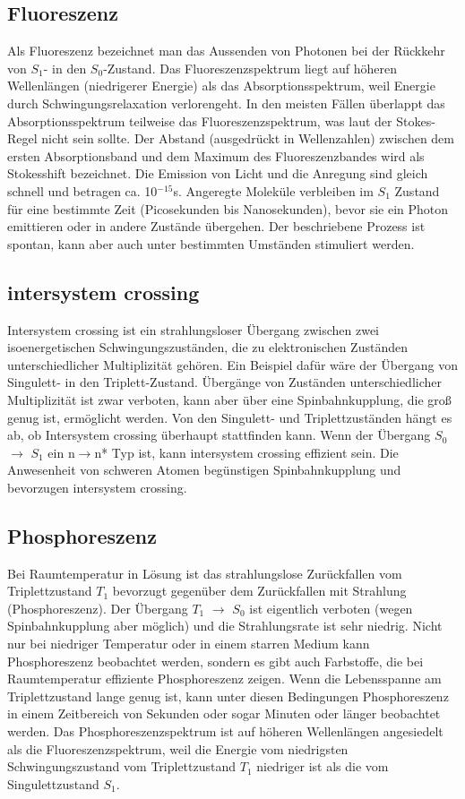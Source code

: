 \subsection{Fluoreszenz}
Als Fluoreszenz bezeichnet man das Aussenden von Photonen bei der Rückkehr von $S_1$- in den $S_0$-Zustand. Das Fluoreszenzspektrum liegt auf höheren Wellenlängen (niedrigerer Energie) als das Absorptionsspektrum, weil Energie durch Schwingungsrelaxation verlorengeht. In den meisten Fällen überlappt das Absorptionsspektrum teilweise das Fluoreszenzspektrum, was laut der Stokes-Regel nicht sein sollte. Der Abstand (ausgedrückt in Wellenzahlen) zwischen dem ersten Absorptionsband und dem Maximum des Fluoreszenzbandes wird als Stokesshift bezeichnet. Die Emission von Licht und die Anregung sind gleich schnell und betragen ca. 10$^{-15}$s. Angeregte Moleküle verbleiben im $S_1$ Zustand für eine bestimmte Zeit (Picosekunden bis Nanosekunden), bevor sie ein Photon emittieren oder in andere Zustände übergehen. Der beschriebene Prozess ist spontan, kann aber auch unter bestimmten Umständen stimuliert werden.
\subsection{intersystem crossing}
Intersystem crossing ist ein strahlungsloser Übergang zwischen zwei isoenergetischen  Schwingungszuständen, die zu elektronischen Zuständen unterschiedlicher Multiplizität gehören. Ein Beispiel dafür wäre der Übergang von Singulett- in den Triplett-Zustand. Übergänge von Zuständen unterschiedlicher Multiplizität ist zwar verboten, kann aber  über eine Spinbahnkupplung, die groß genug ist, ermöglicht werden. Von den Singulett- und Triplettzuständen hängt es ab, ob Intersystem crossing überhaupt stattfinden kann. Wenn der Übergang $S_0$ $\rightarrow$  $S_1$ ein n$\rightarrow$n* Typ ist, kann intersystem crossing effizient sein. Die Anwesenheit von schweren Atomen begünstigen Spinbahnkupplung und bevorzugen intersystem crossing.

\subsection{Phosphoreszenz}
Bei Raumtemperatur in Lösung ist das strahlungslose Zurückfallen vom Triplettzustand $T_1$ bevorzugt gegenüber dem Zurückfallen mit Strahlung (Phosphoreszenz). Der Übergang $T_1$ $\rightarrow$ $S_0$ ist eigentlich verboten (wegen Spinbahnkupplung aber möglich) und die Strahlungsrate ist sehr niedrig. Nicht nur bei niedriger Temperatur oder in einem starren Medium kann Phosphoreszenz beobachtet werden, sondern es gibt auch Farbstoffe, die bei Raumtemperatur effiziente Phosphoreszenz zeigen. %
Wenn die Lebensspanne am Triplettzustand lange genug ist, kann unter diesen Bedingungen Phosphoreszenz in einem Zeitbereich von Sekunden oder sogar Minuten oder länger beobachtet werden. Das Phosphoreszenzspektrum ist auf höheren Wellenlängen angesiedelt als die Fluoreszenzspektrum, weil die Energie vom niedrigsten Schwingungszustand vom Triplettzustand $T_1$ niedriger ist als die vom Singulettzustand $S_1$.

